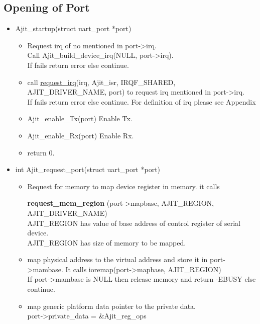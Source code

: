 \documentclass[12pt,a4paper]{article}
\begin{document}
\subsection{Opening of Port}
\begin{itemize}
\item Ajit\_startup(struct uart\_port *port)
\begin{itemize}
\item  Request irq of no mentioned in port-\textgreater irq.\\Call Ajit\_build\_device\_irq(NULL, port-\textgreater irq).\\ If fails return error else continue.

\item call \hyperlink{requestirq}{request\_irq}(irq, Ajit\_isr, IRQF\_SHARED, AJIT\_DRIVER\_NAME, port) to request irq mentioned in port-\textgreater irq.\\ If fails return error else continue. For definition of irq please see Appendix
\item 	Ajit\_enable\_Tx(port) Enable Tx.
\item 	Ajit\_enable\_Rx(port)	Enable Rx.
\item return 0.
\end{itemize}
\item int Ajit\_request\_port(struct uart\_port *port)
\begin{itemize}
\item Request for memory to map device register in memory. it calls
 
 \textbf  {request\_mem\_region} (port-\textgreater mapbase, AJIT\_REGION, AJIT\_DRIVER\_NAME) \\
AJIT\_REGION has value of base address of control register of serial device.\\
AJIT\_REGION has size of memory to be mapped.

\item map physical address to the virtual address and store it in port-\textgreater mambase. It calls ioremap(port-\textgreater mapbase, AJIT\_REGION) \\
If port-\textgreater mambase is NULL then release memory and return -EBUSY else continue.
\item map generic platform data pointer to the private data.\\ port-\textgreater private\_data = \&Ajit\_reg\_ops 
\end{itemize}
\end{itemize}
\end{document}
